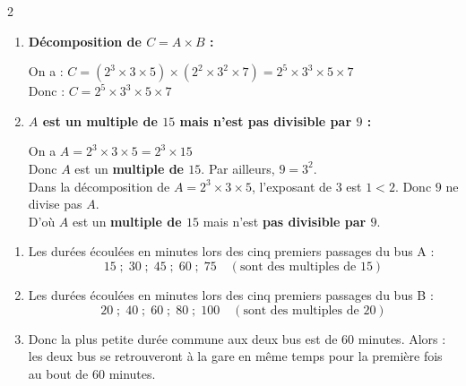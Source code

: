 \documentclass[10pt, a4paper]{article}
\begin{document}
\begin{multicols*}{2}
\begin{Solution}[APPLICATION][9]
\begin{enumerate}[leftmargin=*,itemsep=0.5pt]
\begin{multicols}{2}
    \columnbreak

    \[
    \begin{array}{r|l}
    252 & 2 \\
    126 & 2 \\
    63  & 3 \\
    21  & 3 \\
    7   & 7 \\
    1   &
    \end{array}
    \]
    \end{multicols}
    Donc $A = 2^3 \times 3 \times 5$ \quad et \quad $B = 2^2 \times 3^2 \times 7$.

    \item \textbf{Décomposition de $C = A \times B$ :}

    On a :
        $C = (2^3 \times 3 \times 5) \times (2^2 \times 3^2 \times 7)
          = 2^5 \times 3^3 \times 5 \times 7$ \\
    Donc : \quad $C = 2^5 \times 3^3 \times 5 \times 7$

    \item \textbf{$A$ est un multiple de $15$ mais n'est pas divisible par $9$ :}

    On a $A = 2^3 \times 3 \times 5 = 2^3 \times 15$ \\
    Donc $A$ est un \textbf{multiple de $15$}. Par ailleurs, $9 = 3^2$. \\
    Dans la décomposition de $A = 2^3 \times 3 \times 5$, l'exposant de $3$ est $1 < 2$. 
    Donc $9$ ne divise pas $A$. \\
    D'où $A$ est un \textbf{multiple de $15$} mais n'est \textbf{pas divisible par $9$}.
\end{enumerate}
\end{Solution}

\begin{Solution}[ACTIVITÉ][4]
\begin{enumerate}[leftmargin=*,itemsep=0.5pt]
    \item Les durées écoulées en minutes lors des cinq premiers passages du bus A :
\[15 \; ; \; 30 \; ; \; 45 \; ; \; 60 \; ; \; 75 \quad (\text{sont des multiples de~} 15) \]

    \item Les durées écoulées en minutes lors des cinq premiers passages du bus B :
\[20 \; ; \; 40 \; ; \; 60 \; ; \; 80 \; ; \; 100 \quad (\text{sont des multiples de~} 20) \]

    \item Donc la plus petite durée commune aux deux bus est de 60 minutes. 
    Alors : les deux bus se retrouveront à la gare en même temps pour la première fois au bout de 60 minutes.


\end{enumerate}
\end{Solution}
\end{multicols*}
\end{document}
